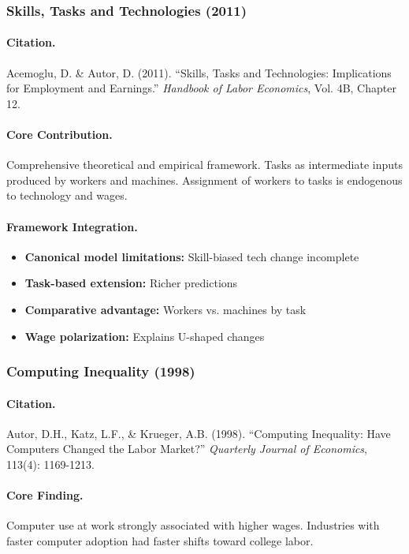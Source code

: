 \subsubsection{Skills, Tasks and Technologies (2011)}

\paragraph{Citation.}
Acemoglu, D. \& Autor, D. (2011). ``Skills, Tasks and Technologies:
Implications for Employment and Earnings.''
\emph{Handbook of Labor Economics}, Vol. 4B, Chapter 12.

\paragraph{Core Contribution.}
Comprehensive theoretical and empirical framework. Tasks as intermediate
inputs produced by workers and machines. Assignment of workers to tasks
is endogenous to technology and wages.

\paragraph{Framework Integration.}
\begin{itemize}
  \item \textbf{Canonical model limitations:} Skill-biased tech change incomplete
  \item \textbf{Task-based extension:} Richer predictions
  \item \textbf{Comparative advantage:} Workers vs. machines by task
  \item \textbf{Wage polarization:} Explains U-shaped changes
\end{itemize}

\subsubsection{Computing Inequality (1998)}

\paragraph{Citation.}
Autor, D.H., Katz, L.F., \& Krueger, A.B. (1998). ``Computing Inequality:
Have Computers Changed the Labor Market?''
\emph{Quarterly Journal of Economics}, 113(4): 1169-1213.

\paragraph{Core Finding.}
Computer use at work strongly associated with higher wages. Industries
with faster computer adoption had faster shifts toward college labor.

